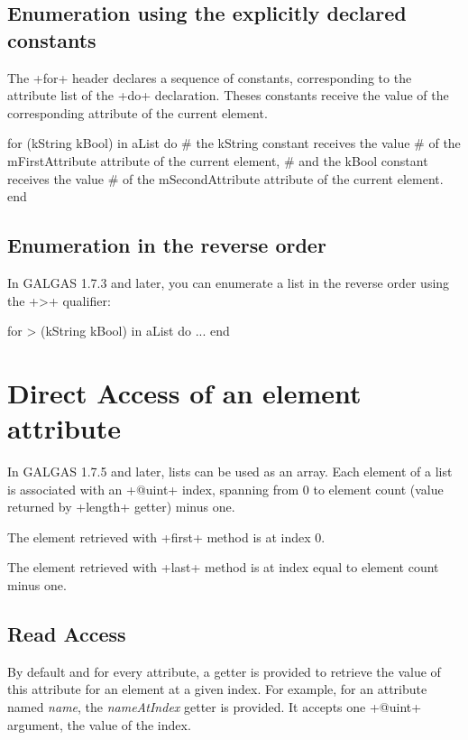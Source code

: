 \subsection{Enumeration using the explicitly declared constants}

The \ggst+for+ header declares a sequence of constants, corresponding to the attribute list of the \ggst+do+ declaration. Theses constants receive the value of the corresponding attribute of the current element.


\begin{galgas3}
for (kString kBool) in aList do
  # the kString constant receives the value
  # of the mFirstAttribute attribute of the current element,
  # and the kBool constant receives the value
  # of the mSecondAttribute attribute of the current element.
end
\end{galgas3}

\subsection{Enumeration in the reverse order}

In GALGAS 1.7.3 and later, you can enumerate a list in the reverse order using the \ggst+>+ qualifier:

\begin{galgas3}
for > (kString kBool) in aList do
  ...
end
\end{galgas3}




\section{Direct Access of an element attribute}

In GALGAS 1.7.5 and later, lists can be used as an array. Each element of a list is associated with an \ggst+@uint+ index, spanning from 0 to element count (value returned by \ggst+length+ getter) minus one.

The element retrieved with \ggst+first+ method is at index 0.

The element retrieved with \ggst+last+ method is at index equal to element count minus one.

\subsection{Read Access}

By default and for every attribute, a getter is provided to retrieve the value of this attribute for an element at a given index. For example, for an attribute named \emph{name}, the \emph{nameAtIndex} getter is provided. It accepts one \ggst+@uint+ argument, the value of the index.

